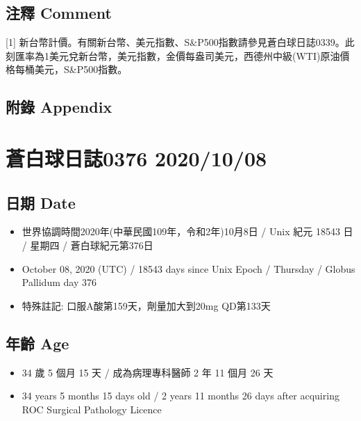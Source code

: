 \documentclass[a5paper, 11pt
]{book}
\providecommand{\tightlist}{%
  \setlength{\itemsep}{0pt}\setlength{\parskip}{0pt}}
\begin{document}
\hypertarget{ux6ce8ux91cb-comment-34}{%
\subsection{注釋 Comment}\label{ux6ce8ux91cb-comment-34}}

{[}1{]}
新台幣計價。有關新台幣、美元指數、S\&P500指數請參見蒼白球日誌0339。此刻匯率為1美元兌新台幣，美元指數，金價每盎司美元，西德州中級(WTI)原油價格每桶美元，S\&P500指數。

\hypertarget{ux9644ux9304-appendix-34}{%
\subsection{附錄 Appendix}\label{ux9644ux9304-appendix-34}}

\hypertarget{ux84bcux767dux7403ux65e5ux8a8c0376-20201008}{%
\section{蒼白球日誌0376
2020/10/08}\label{ux84bcux767dux7403ux65e5ux8a8c0376-20201008}}

\hypertarget{ux65e5ux671f-date-35}{%
\subsection{日期 Date}\label{ux65e5ux671f-date-35}}

\begin{itemize}
\tightlist
\item
  世界協調時間2020年(中華民國109年，令和2年)10月8日 / Unix 紀元 18543 日
  / 星期四 / 蒼白球紀元第376日
\item
  October 08, 2020 (UTC) / 18543 days since Unix Epoch / Thursday /
  Globus Pallidum day 376
\item
  特殊註記: 口服A酸第159天，劑量加大到20mg QD第133天
\end{itemize}

\hypertarget{ux5e74ux9f61-age-35}{%
\subsection{年齡 Age}\label{ux5e74ux9f61-age-35}}

\begin{itemize}
\tightlist
\item
  34 歲 5 個月 15 天 / 成為病理專科醫師 2 年 11 個月 26 天
\item
  34 years 5 months 15 days old / 2 years 11 months 26 days after
  acquiring ROC Surgical Pathology Licence
\end{itemize}
\end{document}
